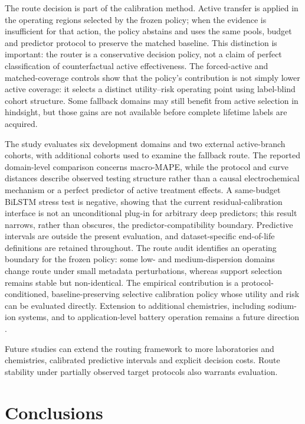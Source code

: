 \documentclass[preprint,12pt]{elsarticle}
\begin{document}
The route decision is part of the calibration method. Active transfer is applied in the operating regions selected by the frozen policy; when the evidence is insufficient for that action, the policy abstains and uses the same pools, budget and predictor protocol to preserve the matched baseline. This distinction is important: the router is a conservative decision policy, not a claim of perfect classification of counterfactual active effectiveness. The forced-active and matched-coverage controls show that the policy's contribution is not simply lower active coverage: it selects a distinct utility--risk operating point using label-blind cohort structure. Some fallback domains may still benefit from active selection in hindsight, but those gains are not available before complete lifetime labels are acquired.

The study evaluates six development domains and two external active-branch cohorts, with additional cohorts used to examine the fallback route. The reported domain-level comparison concerns macro-MAPE, while the protocol and curve distances describe observed testing structure rather than a causal electrochemical mechanism or a perfect predictor of active treatment effects. A same-budget BiLSTM stress test is negative, showing that the current residual-calibration interface is not an unconditional plug-in for arbitrary deep predictors; this result narrows, rather than obscures, the predictor-compatibility boundary. Predictive intervals are outside the present evaluation, and dataset-specific end-of-life definitions are retained throughout. The route audit identifies an operating boundary for the frozen policy: some low- and medium-dispersion domains change route under small metadata perturbations, whereas support selection remains stable but non-identical. The empirical contribution is a protocol-conditioned, baseline-preserving selective calibration policy whose utility and risk can be evaluated directly. Extension to additional chemistries, including sodium-ion systems, and to application-level battery operation remains a future direction \citep{he2026sodium,yang2018emissions}.

Future studies can extend the routing framework to more laboratories and chemistries, calibrated predictive intervals and explicit decision costs. Route stability under partially observed target protocols also warrants evaluation.

\section{Conclusions}
\label{sec:conclusion}
\end{document}
